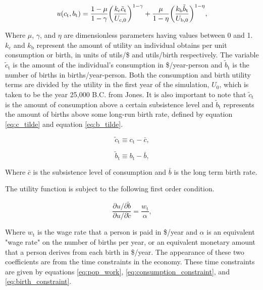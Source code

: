 \documentclass[letterpaper,12pt]{article}
\begin{document}
\begin{equation} \label{eq:utility_function}
u(c_\mathrm{t}, b_\mathrm{t}) = \frac{1-\mu}{1-\gamma} \bigg{(}\frac{k_\mathrm{c} \tilde c_\mathrm{t}}{U_\mathrm{c,0}} \bigg{)}^{1-\gamma} + \frac{\mu}{1-\eta} \bigg{(}\frac{k_\mathrm{b} \tilde b_\mathrm{t}}{U_\mathrm{b,0}} \bigg{)}^{1-\eta},
\end{equation}

Where $\mu$, $\gamma$, and $\eta$ are dimensionless parameters having values between 0 and 1. $k_\mathrm{c}$ and $k_\mathrm{b}$ represent the amount of utility an individual obtains per unit consumption or birth, in units of utils/\$ and utils/birth respectively. The variable $\tilde c_\mathrm{t}$ is the amount of the individual's consumption in \$/year-person and $\tilde b_\mathrm{t}$ is the number of births in births/year-person. Both the consumption and birth utility terms are divided by the utility in the first year of the simulation, $U_\mathrm{0}$, which is taken to be the year 25,000 B.C. from Jones. It is also important to note that $\tilde c_\mathrm{t}$ is the amount of consumption above a certain subsistence level and $\tilde b_\mathrm{t}$ represents the amount of births above some long-run birth rate, defined by equation \ref{eq:c_tilde} and equation \ref{eq:b_tilde}.

\begin{equation} \label{eq:c_tilde}
\tilde c_\mathrm{t} \equiv c_\mathrm{t} - \bar c,
\end{equation}

\begin{equation} \label{eq:b_tilde}
\tilde b_\mathrm{t} \equiv b_\mathrm{t} - \bar b,
\end{equation}

Where $\bar c$ is the subsistence level of consumption and $\bar b$ is the long term birth rate.

The utility function is subject to the following first order condition.

\begin{equation} \label{eq:first_order_condition}
\frac{\partial u/ \partial\tilde b}{\partial u/ \partial\tilde c} = \frac{w_\mathrm{t}}{\alpha},
\end{equation}

Where $w_\mathrm{t}$ is the wage rate that a person is paid in \$/year and $\alpha$ is an equivalent "wage rate" on the number of births per year, or an equivalent monetary amount that a person derives from each birth in \$/year. The appearance of these two coefficients are from the time constraints in the economy. These time constraints are given by equations \ref{eq:pop_work}, \ref{eq:consumption_constraint}, and \ref{eq:birth_constraint}.
\end{document}
